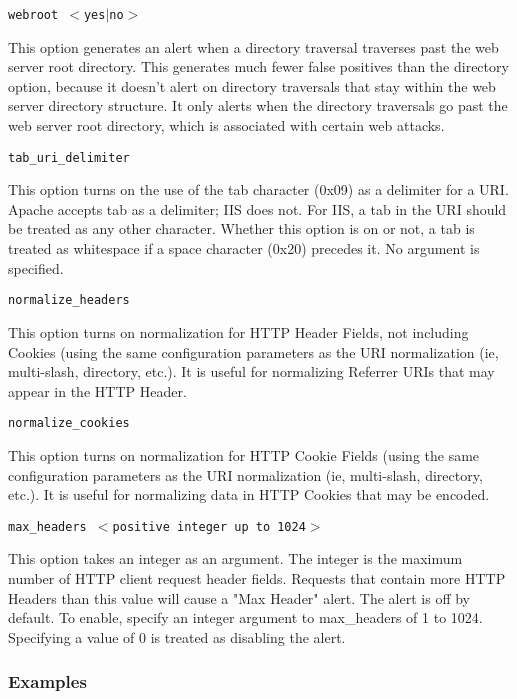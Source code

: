 \documentclass[english]{report}
\newcounter{slistnum}
\newenvironment{slist}
{ \begin{list}{ {\bf \arabic{slistnum}.} }{\usecounter{slistnum} } }
{ \end{list} }
\begin{document}
\begin{slist}
\item \texttt{webroot $<$yes$|$no$>$}

This option generates an alert when a directory traversal traverses past the
web server root directory.  This generates much fewer false positives than the
directory option, because it doesn't alert on directory traversals that stay
within the web server directory structure.  It only alerts when the directory
traversals go past the web server root directory, which is associated with
certain web attacks.

\item \texttt{tab\_uri\_delimiter}

This option turns on the use of the tab character (0x09) as a delimiter for a
URI.  Apache accepts tab as a delimiter; IIS does not.  For IIS, a tab in the
URI should be treated as any other character.  Whether this option is on or
not, a tab is treated as whitespace if a space character (0x20) precedes it.
No argument is specified.

\item \texttt{normalize\_headers}

This option turns on normalization for HTTP Header Fields, not including
Cookies (using the same configuration parameters as the URI normalization (ie,
multi-slash, directory, etc.).  It is useful for normalizing Referrer URIs that
may appear in the HTTP Header.

\item \texttt{normalize\_cookies}

This option turns on normalization for HTTP Cookie Fields (using the same
configuration parameters as the URI normalization (ie, multi-slash, directory,
etc.).  It is useful for normalizing data in HTTP Cookies that may be encoded.

\item \texttt{max\_headers $<$positive integer up to 1024$>$}

This option takes an integer as an argument.  The integer is the maximum number
of HTTP client request header fields.  Requests that contain more HTTP Headers
than this value will cause a "Max Header" alert.  The alert is off by default.
To enable, specify an integer argument to max\_headers of 1 to 1024.
Specifying a value of 0 is treated as disabling the alert.

\end{slist}

\subsubsection{Examples}
\end{document}
